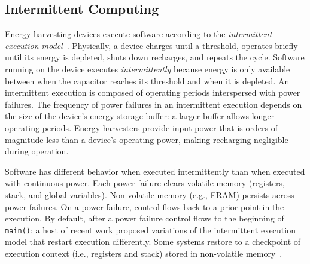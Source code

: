 \subsection{Intermittent Computing}
\label{sec:background_consistency}
Energy-harvesting devices execute software according to the {\em intermittent
execution model}~\cite{dino,chain,alpaca,ratchet}.  Physically, a device
charges until a threshold, operates briefly until its energy is depleted, shuts
down recharges, and repeats the cycle.  Software running on the device executes
{\em intermittently} because energy is only available between when the
capacitor reaches its threshold and when it is depleted. An intermittent
execution is composed of operating periods interspersed with power failures.
The frequency of power failures in an intermittent execution depends on the
size of the device's energy storage buffer: a larger buffer allows longer
operating periods.  Energy-harvesters provide input power that is orders of
magnitude less than a device's operating power, making recharging negligible
during operation.

Software has different behavior when executed intermittently than when executed
with continuous power.  Each power failure clears volatile memory (registers,
stack, and global variables). Non-volatile memory (e.g., FRAM) persists across
power failures. On a power failure, control flows back to a prior point in the
execution. By default, after a power failure control flows to the beginning of
{\tt main()}; a host of recent work proposed variations of the intermittent
execution model that restart execution differently. Some systems restore to a
checkpoint of execution context (i.e., registers and stack) stored in
non-volatile memory~\cite{mementos,hibernusplusplus,quickrecall,idetic}.

